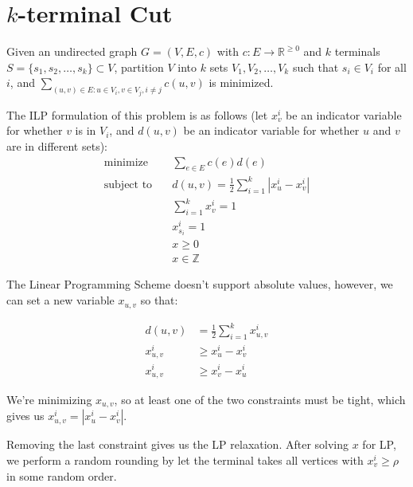 \section{$k$-terminal Cut}

\begin{problem}\label{prob:k-terminal-cut}
Given an undirected graph $G=(V,E,c)$ with $c: E \to \mathbb R^{\ge 0}$ and $k$ terminals $S = \{s_1, s_2, \ldots, s_k\}\subset V$, partition $V$ into $k$ sets $V_1, V_2, \ldots, V_k$ such that $s_i\in V_i$ for all $i$, and $\sum_{(u,v)\in E: u\in V_i, v\in V_j, i\ne j} c(u,v)$ is minimized.
\end{problem}

The ILP formulation of this problem is as follows (let $x_v^i$ be an indicator variable for whether $v$ is in $V_i$, and $d(u,v)$ be an indicator variable for whether $u$ and $v$ are in different sets):
\begin{align*}
	\text{minimize} \quad   & \sum_{e\in E} c(e) d(e)                          \\
	\text{subject to} \quad & d(u,v) = \frac{1}{2}\sum_{i=1}^k |x_u^i - x_v^i| \\
	                        & \sum_{i=1}^k x_v^i = 1                           \\
	                        & x_{s_i}^i = 1                                    \\
	                        & x \ge 0                                          \\
	                        & x \in \mathbb Z
\end{align*}

The Linear Programming Scheme doesn't support absolute values, however, we can set a new variable $x_{u,v}$ so that:

\begin{align*}
	d(u,v)    & = \frac{1}{2}\sum_{i=1}^k x_{u,v}^i \\
	x_{u,v}^i & \ge x_u^i - x_v^i                   \\
	x_{u,v}^i & \ge x_v^i - x_u^i
\end{align*}

We're minimizing $x_{u,v}$, so at least one of the two constraints must be tight, which gives us $x_{u,v}^i = |x_u^i - x_v^i|$.


Removing the last constraint gives us the LP relaxation. After solving $x$ for LP, we perform a random rounding by let the terminal takes all vertices with $x_v^i \ge \rho$ in some random order.

